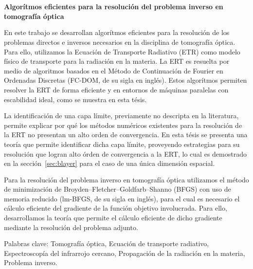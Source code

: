 \chapter*{}%
%

\begin{center}
\begin{large}
\textbf{Algorítmos eficientes para la resolución 
del problema inverso en tomografía óptica}
\end{large}
\end{center}

\vspace{1cm}
En este trabajo se desarrollan   
algorítmos eficientes para la resolución de los problemas directos 
e inversos necesarios en la disciplina de tomografía óptica. Para ello, utilizamos la Ecuación de Transporte 
Radiativo (ETR) como modelo físico de transporte para la radiación 
en la materia. 
La ERT es resuelta por medio de algoritmos basados en el Método  
de Continuación de Fourier en Ordenadas Discretas (FC-DOM, de su sigla en inglés). Estos algorítmos 
permiten resolver la ERT de forma eficiente y en entornos de máquinas paralelas 
con escabilidad ideal, como se muestra en esta tésis. 

La identificación de una capa límite, previamente no descripta en la literatura, 
permite explicar por qué los métodos numéricos existentes para la resolución de la ERT 
no presentan un alto orden de convergencia. En esta tésis se presenta 
una teoría que permite identificar dicha capa límite, proveyendo  
estrategias para su resolución que logran alto órden de convergencia 
a la ERT, lo cual es demostrado en la sección~\ref{sec:blayer} para el caso de una única dimensión espacial.

Para la resolución del problema inverso en tomografía óptica utilizamos el método de minimización 
de Broyden–Fletcher–Goldfarb–Shanno (BFGS) con uso de memoria reducido 
(lm-BFGS, de su sigla en inglés), 
para el cual es necesario el cálculo eficiente del gradiente 
de la función objetivo involucrada. Para ello, desarrollamos la teoría 
que permite el cálculo eficiente de dicho gradiente  
mediante la resolución del problema adjunto. 


\vspace{1cm}
\noindent
Palabras clave: 
Tomografía óptica,
Ecuación de transporte radiativo, 
Espectroscopía del infrarrojo cercano, 
Propagación de la radiación en la materia,
Problema inverso.
